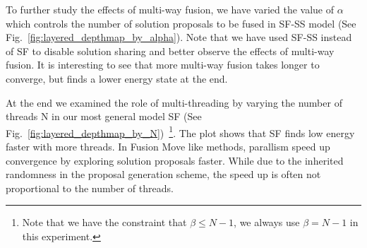 %
To further study the effects of multi-way fusion, we have varied the
value of $\alpha$ which controls the number of solution proposals to be
fused in SF-SS model (See
Fig.~\ref{fig:layered_depthmap_by_alpha}). Note that we have used SF-SS
instead of SF to disable solution sharing and better observe the effects
of multi-way fusion.
It is interesting to see that more multi-way fusion takes longer to
converge, but finds a lower energy state at the end.

At the end we examined the role of multi-threading by varying the number of threads N in our most general model SF (See Fig.~\ref{fig:layered_depthmap_by_N})~\footnote{Note that we have the constraint that $\beta \leq N-1$, we always use $\beta = N-1$ in this experiment.}. The plot shows that SF finds low energy faster with more threads. In Fusion Move like methods, parallism speed up convergence by exploring solution proposals faster. While due to the inherited randomness in the proposal generation scheme, the speed up is often not proportional to the number of threads.
